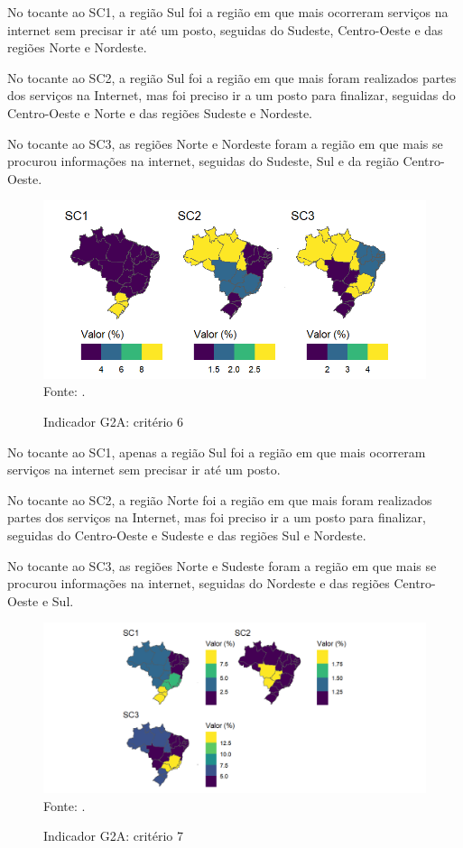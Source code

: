 No tocante ao SC1, a região Sul foi a região em que mais ocorreram serviços na internet sem precisar ir até um posto, seguidas do Sudeste, Centro-Oeste e das regiões Norte e Nordeste.

No tocante ao SC2, a região Sul foi a região em que mais foram realizados partes dos serviços na Internet, mas foi preciso ir a um posto para finalizar, seguidas do Centro-Oeste e Norte e das regiões Sudeste e Nordeste.

No tocante ao SC3, as regiões Norte e Nordeste foram a região em que mais se procurou informações na internet, seguidas do Sudeste, Sul e da região Centro-Oeste.

\begin{figure}[H]
	\centering
	\caption{Indicador G2A: critério 6}
	\includegraphics[width=1\linewidth]{figuras/mapa_coropletico_tic_domicilios_2024_g2a_6.png}
	\label{fig:mapa_coropletico_tic_domicilios_2024_g2a_6}
	\footnotesize{Fonte: \cite{tic_domicilios_2024_g2a}.}
\end{figure}

No tocante ao SC1, apenas a região Sul foi a região em que mais ocorreram serviços na internet sem precisar ir até um posto.

No tocante ao SC2, a região Norte foi a região em que mais foram realizados partes dos serviços na Internet, mas foi preciso ir a um posto para finalizar, seguidas do Centro-Oeste e Sudeste e das regiões Sul e Nordeste.

No tocante ao SC3, as regiões Norte e Sudeste foram a região em que mais se procurou informações na internet, seguidas do Nordeste e das regiões Centro-Oeste e Sul.

\begin{figure}[H]
	\centering
	\caption{Indicador G2A: critério 7}
	\includegraphics[width=1\linewidth]{figuras/mapa_coropletico_tic_domicilios_2024_g2a_7.png}
	\label{fig:mapa_coropletico_tic_domicilios_2024_g2a_7}
	\footnotesize{Fonte: \cite{tic_domicilios_2024_g2a}.}
\end{figure}

